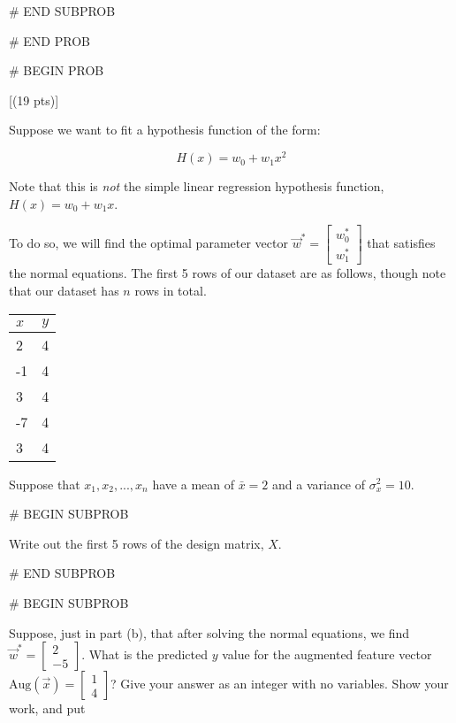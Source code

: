 \documentclass[twoside,12pt]{article}
\begin{document}
{{%
    
% 

# END SUBPROB
    

    


# END PROB

\newpage

# BEGIN PROB

[(19 pts)]

Suppose we want to fit a hypothesis function of the form:

$$H(x) = w_0 + w_1 x^2$$

Note that this is \textit{not} the simple linear regression hypothesis function, $H(x) = w_0 + w_1x$.

To do so, we will find the optimal parameter vector $\vec{w}^* = \begin{bmatrix} w_0^* \\ w_1^* \end{bmatrix}$ that satisfies the normal equations. The first 5 rows of our dataset are as follows, though note that our dataset has $n$ rows in total.

\begin{table}[H]
\centering
\begin{tabular}{|l|l|}
\hline
$x$ & $y$ \\ \hline
2   & 4   \\ \hline
-1  & 4   \\ \hline
3   & 4  \\ \hline
-7  & 4   \\ \hline
3   & 4   \\ \hline
\end{tabular}
\end{table}

Suppose that $x_1, x_2, ..., x_n$ have a mean of $\bar{x} = 2$ and a variance of $\sigma_x^2 = 10$.



# BEGIN SUBPROB

 Write out the first 5 rows of the design matrix, $X$.

\begin{responsebox}{1.5in}
    
\end{responsebox}



# END SUBPROB

# BEGIN SUBPROB

 Suppose, just in part (b), that after solving the normal equations, we find $\vec{w}^* = \begin{bmatrix} 2 \\ -5 \end{bmatrix}$. What is the predicted $y$ value for the augmented feature vector $\text{Aug}(\vec{x}) =  \begin{bmatrix} 1 \\ 4 \end{bmatrix}$? Give your answer as an integer with no variables. Show your work, and put 

}}
\end{document}
